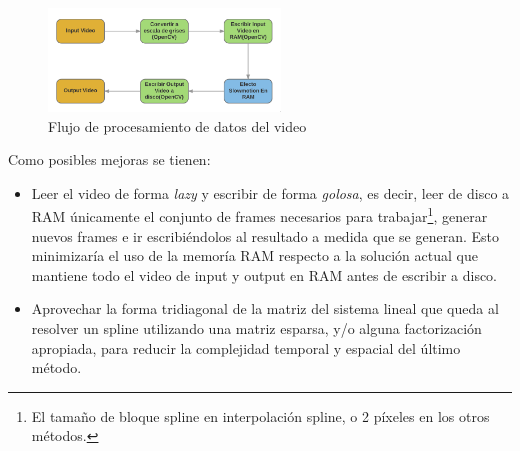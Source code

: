 \begin{figure}[h!]
  \begin{centering}
    \includegraphics[width=0.55\textwidth]{img/dataflow.png}
     \caption{Flujo de procesamiento de datos del video}\label{fig:dataflow}
 \end{centering}
\end{figure}

Como posibles mejoras se tienen:
\begin{itemize}
	 \item Leer el video de forma \emph{lazy} y escribir de forma \emph{golosa}, es decir, leer de disco a RAM únicamente el conjunto de frames necesarios para trabajar\footnote{El tamaño de bloque spline en interpolación spline, o 2 píxeles en los otros métodos.}, generar nuevos frames e ir escribiéndolos al resultado a medida que se generan. Esto minimizaría el uso de la memoría RAM respecto a la solución actual que mantiene todo el video de input y output en RAM antes de escribir a disco.

	 \item Aprovechar la forma tridiagonal de la matriz del sistema lineal que queda al resolver un spline utilizando una matriz esparsa, y/o alguna factorización apropiada, para reducir la complejidad temporal y espacial del último método.
\end{itemize}




